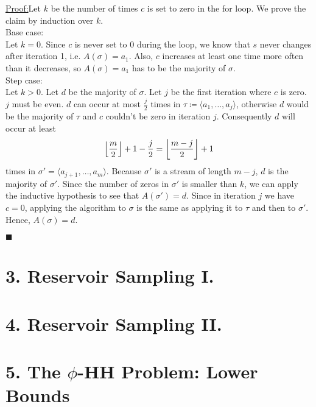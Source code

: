 \documentclass{article}
\DeclarePairedDelimiter\floor{\lfloor}{\rfloor}
\newenvironment{claimproof}[1]{\par\noindent\underline{Proof:}\space#1}{\hfill $\blacksquare$}
\begin{document}
\begin{claimproof}
Let $k$ be the number of times $c$ is set to zero in the for loop. We prove the claim by induction over $k$. \\

Base case:\\
Let $k=0$. Since $c$ is never set to $0$ during the loop,
we know that $s$ never changes after iteration 1, i.e. $A(\sigma) = a_1$.
Also, $c$ increases at least one time more often than it decreases,
so $A(\sigma) = a_1$ has to be the majority of $\sigma$. \\

Step case:\\
Let $k>0$. Let $d$ be the majority of $\sigma$. Let $j$ be the first iteration where $c$ is zero. $j$ must be even.
$d$ can occur at most $\frac{j}{2}$ times in $\tau \coloneqq \langle a_1, \hdots, a_j \rangle$,
otherwise $d$ would be the majority of $\tau$ and $c$ couldn't be zero in iteration $j$. Consequently $d$ will occur at least
\[
\floor*{\frac{m}{2}} + 1 - \frac{j}{2} = \floor*{\frac{m-j}{2}} + 1
\]
times in $\sigma' = \langle a_{j+1}, \hdots, a_m \rangle$.
Because $\sigma'$ is a stream of length $m-j$, $d$ is the majority of $\sigma'$.
Since the number of zeros in $\sigma'$ is smaller than $k$,
we can apply the inductive hypothesis to see that $A(\sigma') = d$.
Since in iteration $j$ we have $c=0$, applying the algorithm to $\sigma$ is the same as
applying it to $\tau$ and then to $\sigma'$. Hence, $A(\sigma) = d$.

\end{claimproof}


\section*{3. Reservoir Sampling I.}



\section*{4. Reservoir Sampling II.}



\section*{5. The $\phi$-HH Problem: Lower Bounds}
\end{document}
